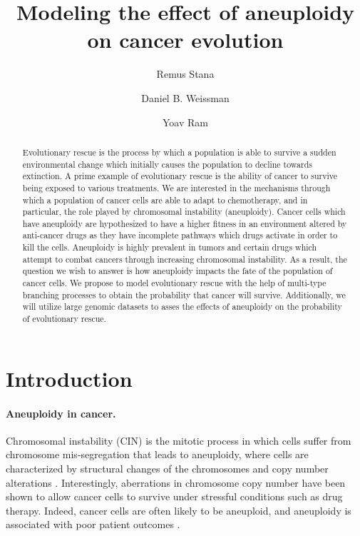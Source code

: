 \documentclass[12pt]{extarticle}
\title{Modeling the effect of aneuploidy on cancer evolution}
\author[1]{Remus Stana}
\author[2]{Daniel B. Weissman}
\author[1,*]{Yoav Ram}
\affil[1]{School of Zoology, Tel Aviv University}
\affil[2]{Department of Physics, Emory University}
\affil[*]{Corresponding author: yoav@yoavram.com}
\begin{document}
\maketitle

\begin{abstract}
Evolutionary rescue is the process by which a population is able to survive a sudden environmental change which initially causes the population to decline towards extinction. A prime example of evolutionary rescue is the ability of cancer to survive being exposed to various treatments. We are interested in the mechanisms through which a population of cancer cells are able to adapt to chemotherapy, and in particular, the role played by chromosomal instability (aneuploidy). Cancer cells which have aneuploidy are hypothesized to have a higher fitness in an environment altered by anti-cancer drugs as they have incomplete pathways which drugs activate in order to kill the cells. Aneuploidy is highly prevalent in tumors and certain drugs which attempt to combat cancers through increasing chromosomal instability. As a result, the question we wish to answer is how aneuploidy impacts the fate of the population of cancer cells. We propose to model evolutionary rescue with the help of multi-type branching processes to obtain the probability that cancer will survive. Additionally, we will utilize large genomic datasets to asses the effects of aneuploidy on the probability of evolutionary rescue.
\end{abstract}

\newpage
\section*{Introduction}




\paragraph{Aneuploidy in cancer.} Chromosomal instability (CIN) is the mitotic process in which cells suffer from chromosome mis-segregation that leads to aneuploidy, where cells are characterized by structural changes of the chromosomes and copy number alterations \cite{schukken2018cin}.
Interestingly, aberrations in chromosome copy number have been shown to allow cancer cells to survive under stressful conditions such as drug therapy. %
Indeed, cancer cells are often likely to be aneuploid, and aneuploidy is associated with poor patient outcomes \cite{ben2020context}.
\end{document}
